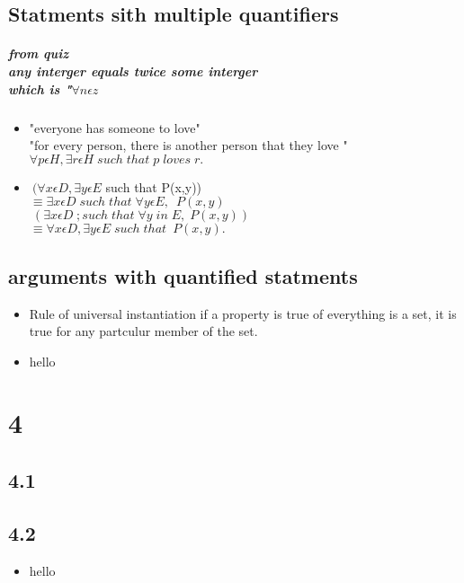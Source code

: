 \documentclass[10pt,letterpaper]{report}
\begin{document}
\section{Statments sith multiple quantifiers}
\paragraph{from quiz \\ any interger equals twice some interger \\ which is "$\forall n \epsilon z $}
\begin{itemize}
\item "everyone has someone to love" \\ "for every person, there is another person that they love " \\ $ \forall p \epsilon H , \exists r \epsilon H \; such \; that \; p \; loves \; r.$ 
\item $ ~( \forall x \epsilon D , \exists y \epsilon E $ such that P(x,y)) \\ $ \equiv \exists x \epsilon D \; such \; that \; \forall y \epsilon E, \; ~P(x,y)$ \\ $ ~(\exists x \epsilon D \;; such \; that  \; \forall y \; in \; E, \; P(x,y)) $ \\ $ \equiv \forall x \epsilon D , \exists y \epsilon E \; such \; that \; ~P(x,y). $
\end{itemize} 
\section{arguments with quantified statments}
\begin{itemize}
\item Rule of universal instantiation if a property is true of everything is a set, it is true for any partculur member of the set.
\item hello
\end{itemize}

\chapter{4}
\section{4.1}
\section{4.2}
\begin{itemize}
\item hello
\end{itemize}
\end{document}
